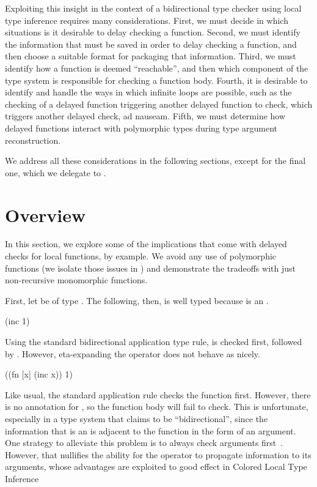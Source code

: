 Exploiting this insight in the context of a bidirectional type checker using
local type inference requires many considerations.
First, we must decide in which situations is it desirable to delay checking a function.
Second, we must identify the information that must be saved in order to delay checking a function,
and then choose a suitable format for packaging that information.
Third, we must identify how a function is deemed ``reachable'',
and then which component of the type system is responsible for checking a function body.
Fourth, it is desirable to identify and handle the ways in which 
infinite loops are possible, such as the checking of a delayed function triggering
another delayed function to check, which triggers another delayed check, ad nauseam.
Fifth, we must determine how delayed functions interact with polymorphic types
during type argument reconstruction.

We address all these considerations in the following sections, except
for the final one, which we delegate to .

\section{Overview}

In this section, we explore some of the implications that come with delayed checks for local functions,
by example.
We avoid any use of polymorphic functions
(we isolate those issues in )
and demonstrate the tradeoffs with just non-recursive monomorphic functions.

First, let  be of type .
The following, then, is well typed because  is an .

\begin{cljlisting}
(inc 1)
\end{cljlisting}

Using the standard bidirectional application type rule,  is checked first,
followed by .
However, eta-expanding the operator does not behave as nicely.

\begin{cljlisting}
((fn [x] (inc x)) 1)
\end{cljlisting}

Like usual, the standard application rule checks the function first.
However, there is no annotation for , so the function body will fail
to check.
This is unfortunate, especially in a type system that claims to be ``bidirectional'',
since the information that  is an  is adjacent to the function
in the form of an argument.
One strategy to alleviate this problem is to always check arguments first~\cite{xie2018let}.
However, that nullifies the ability for the operator to propagate information
to its arguments, whose advantages are exploited to good effect in Colored Local Type Inference~\cite{coloredlti01}

